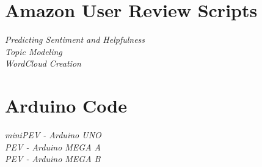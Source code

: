 
\chapter{Amazon User Review Scripts}

\textit{Predicting Sentiment and Helpfulness} \\[10pt]
\textit{Topic Modeling} \\[10pt]
\textit{WordCloud Creation}\\[10pt]







\chapter{Arduino Code}
\textit{miniPEV - Arduino UNO} \\[10pt]
\textit{PEV - Arduino MEGA A} \\[10pt]
\textit{PEV - Arduino MEGA B}\\[10pt]

\newpage
